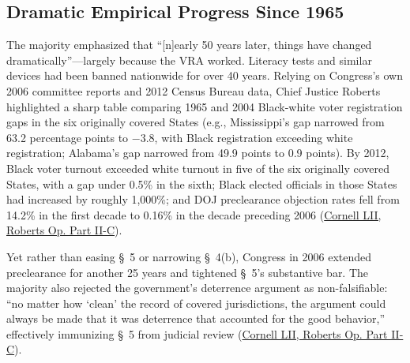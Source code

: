 \documentclass[12pt]{article}
\begin{document}
\subsection{Dramatic Empirical Progress Since 1965}
The majority emphasized that ``[n]early 50 years later, things have changed dramatically''---largely because the VRA worked. Literacy tests and similar devices had been banned nationwide for over 40 years. Relying on Congress's own 2006 committee reports and 2012 Census Bureau data, Chief Justice Roberts highlighted a sharp table comparing 1965 and 2004 Black-white voter registration gaps in the six originally covered States (e.g., Mississippi's gap narrowed from 63.2 percentage points to $-3.8$, with Black registration exceeding white registration; Alabama's gap narrowed from 49.9 points to 0.9 points). By 2012, Black voter turnout exceeded white turnout in five of the six originally covered States, with a gap under 0.5\% in the sixth; Black elected officials in those States had increased by roughly 1,000\%; and DOJ preclearance objection rates fell from 14.2\% in the first decade to 0.16\% in the decade preceding 2006 (\href{https://www.law.cornell.edu/supremecourt/text/12-96}{Cornell LII, Roberts Op. Part II-C}).

Yet rather than easing \S~5 or narrowing \S~4(b), Congress in 2006 extended preclearance for another 25 years and tightened \S~5's substantive bar. The majority also rejected the government's deterrence argument as non-falsifiable: ``no matter how `clean' the record of covered jurisdictions, the argument could always be made that it was deterrence that accounted for the good behavior,'' effectively immunizing \S~5 from judicial review (\href{https://www.law.cornell.edu/supremecourt/text/12-96}{Cornell LII, Roberts Op. Part II-C}).
\end{document}
